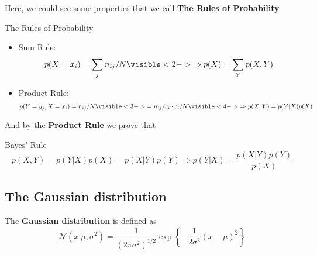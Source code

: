 \begin{frame}{\insertsubsection}

Here, we could see some properties that we call \textbf{The Rules of Probability}

\begin{block}{The Rules of Probability}
	\begin{itemize}
		\item Sum Rule: 
		\begin{align} \label{eq:sum-rule}p(X = x_i) =  \sum_j n_{ij} / N
		\visible<2->{ \Rightarrow p(X) = \sum_Y p(X,Y) }
		\end{align}
		\item Product Rule: \begin{align}\label{eq:product-rule}
		p(Y = y_j , X = x_i)=n_{ij}/N \visible<3->{= n_{ij}/c_i \cdot c_i/N}
		\visible<4->{ \Rightarrow p(X,Y) = p(Y|X)p(X) }
\end{align}
\end{itemize}
\end{block}

\end{frame}

\begin{frame}{\insertsubsection}

And by the \textbf{Product Rule} we prove that

\begin{block}{Bayes' Rule}
\begin{equation}
	p(X,Y) = p(Y|X)p(X) = p(X|Y)p(Y) \Rightarrow p(Y|X) = \frac{p(X|Y)p(Y)}{p(X)}
\end{equation}
\end{block}

\end{frame}

\subsection{The Gaussian distribution}
\begin{frame}{\insertsubsection}
The \textbf{Gaussian distribution} is defined as
	\begin{equation}\label{eq:gaussian-distribution}
	\mathcal{N}(x|\mu,\sigma^2) = \frac{1}{(2\pi\sigma^2)^{1/2}}\exp\left\{-\frac{1}{2\sigma^2}(x-\mu)^2\right\}
	\end{equation}
\end{frame}


